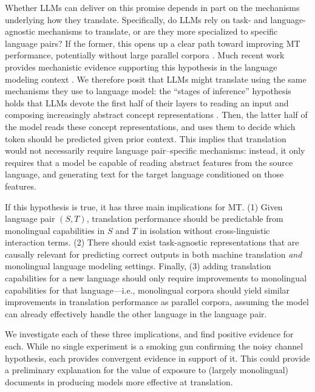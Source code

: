 \documentclass[11pt]{article}
\begin{document}
Whether LLMs can deliver on this promise depends in part on the mechanisms underlying how they translate. Specifically, do LLMs rely on task- and language-agnostic mechanisms to translate, or are they more specialized to specific language pairs? If the former, this opens up a clear path toward improving MT performance, potentially without large parallel corpora \citep{artetxe2018unsupervised}. Much recent work provides mechanistic evidence supporting this hypothesis in the language modeling context \citep{wendler-etal-2024-llamas,brinkmann-etal-2025-large,wu2025the}. We therefore posit that LLMs might translate using the same mechanisms they use to language model: the ``stages of inference'' hypothesis  \citep{lad2024the} holds that LLMs devote the first half of their layers to reading an input and composing increasingly abstract concept representations . Then, the latter half of the model reads these concept representations, and uses them to decide which token should be predicted given prior context. This implies that translation would not necessarily require language pair--specific mechanisms: instead, it only requires that a model be capable of reading abstract features from the source language, and generating text for the target language conditioned on those features.

If this hypothesis is true, it has three main implications for MT. (1) Given language pair $(S,T)$, translation performance should be predictable from monolingual capabilities in $S$ and $T$ in isolation without cross-linguistic interaction terms. (2) There should exist task-agnostic representations that are causally relevant for predicting correct outputs in both machine translation \emph{and} monolingual language modeling settings. Finally, (3) adding translation capabilities for a new language should only require improvements to monolingual capabilities for that language---i.e., monolingual corpora should yield similar improvements in translation performance as parallel corpora, assuming the model can already effectively handle the other language in the language pair.

We investigate each of these three implications, and find positive evidence for each. While no single experiment is a smoking gun confirming the noisy channel hypothesis, each provides convergent evidence in support of it. This could provide a preliminary explanation for the value of exposure to (largely monolingual) documents in producing models more effective at translation.
\end{document}

